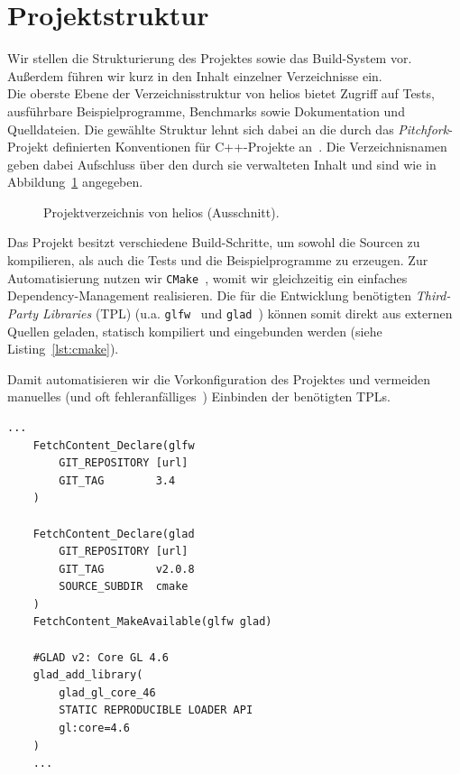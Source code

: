 \section{Projektstruktur}
Wir stellen die Strukturierung des Projektes sowie das Build-System vor.
Außerdem führen wir kurz in den Inhalt einzelner Verzeichnisse ein.\\

Die oberste Ebene der Verzeichnisstruktur von helios bietet Zugriff auf Tests, ausführbare Beispielprogramme, Benchmarks sowie Dokumentation und Quelldateien.
Die gewählte Struktur lehnt sich dabei an die durch das \textit{Pitchfork}-Projekt definierten Konventionen für C++-Projekte an~\cite[]{Pitchfork}.
Die Verzeichnisnamen geben dabei Aufschluss über den durch sie verwalteten Inhalt und sind wie in Abbildung~\ref{fig:verzeichnisstruktur} angegeben.\par

\begin{figure}[htbp]
    \setlength{\DTbaselineskip}{18pt}
    \caption{Projektverzeichnis von helios (Ausschnitt).}
    \label{fig:verzeichnisstruktur}
\end{figure}

Das Projekt besitzt verschiedene Build-Schritte, um sowohl die Sourcen zu kompilieren, als auch die Tests und die Beispielprogramme zu erzeugen.
Zur Automatisierung nutzen wir \texttt{CMake}~\cite[]{CMake}, womit wir gleichzeitig ein einfaches Dependency-Management realisieren.
Die für die Entwicklung benötigten \textit{Third-Party Libraries} (TPL) (u.a. \texttt{glfw}~\cite[]{glfwHomepage} und \texttt{glad}~\cite[]{gladgithub}) können somit direkt aus externen Quellen geladen, statisch kompiliert und eingebunden werden (siehe Listing~\ref{lst:cmake}).\par

Damit automatisieren wir die Vorkonfiguration des Projektes und vermeiden manuelles (und oft fehleranfälliges~\cite[]{FG22}) Einbinden der benötigten TPLs.

\begin{lstlisting}[style=c++style, caption={Ausschnitt aus der CMakeLists.txt von helios: Dieser Abschnitt deklariert und bezieht GLFW v3.4 und GLAD v2.0.8 per FetchContent von den jeweiligen Github-Repositories (URLs der Übersicht halber ausgelassen). Im Anschluss wird ein GLAD-Loader für OpenGL 4.6 als statische Bibliothek erzeugt.}, label=lst:cmake]
    ...
    FetchContent_Declare(glfw
        GIT_REPOSITORY [url]
        GIT_TAG        3.4
    )

    FetchContent_Declare(glad
        GIT_REPOSITORY [url]
        GIT_TAG        v2.0.8
        SOURCE_SUBDIR  cmake
    )
    FetchContent_MakeAvailable(glfw glad)

    #GLAD v2: Core GL 4.6
    glad_add_library(
        glad_gl_core_46
        STATIC REPRODUCIBLE LOADER API
        gl:core=4.6
    )
    ...
\end{lstlisting}


